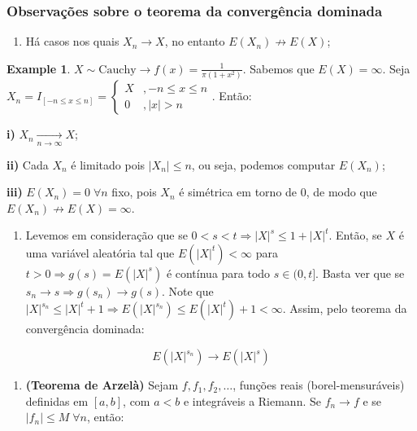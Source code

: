 \documentclass[
]{article}
\providecommand{\tightlist}{%
  \setlength{\itemsep}{0pt}\setlength{\parskip}{0pt}}
\theoremstyle{definition}
\theoremstyle{definition}
\newtheorem{example}{Example}[section]
\theoremstyle{definition}
\theoremstyle{definition}
\theoremstyle{remark}
\begin{document}
\hypertarget{observauxe7uxf5es-sobre-o-teorema-da-converguxeancia-dominada}{%
\subsubsection{Observações sobre o teorema da convergência dominada}\label{observauxe7uxf5es-sobre-o-teorema-da-converguxeancia-dominada}}

\begin{enumerate}
\def\labelenumi{\arabic{enumi}.}
\tightlist
\item
  Há casos nos quais \(X_{n} \to X\), no entanto \(E(X_{n}) \not\to E(X)\);
\end{enumerate}

\begin{example}
\(X \sim \mathrm{Cauchy} \rightarrow f(x) = \frac{1}{\pi(1 + x^{2})}\). Sabemos que \(E(X) = \infty\). Seja \(X_{n} = I_{[-n \le x \le n]} = \begin{cases} X &, -n \le x \le n \\ 0 &, |x| > n \end{cases}\). Então:

\textbf{i)} \(X_{n} \underset{n \to \infty}{\rightarrow} X\);

\textbf{ii)} Cada \(X_{n}\) é limitado pois \(|X_{n}| \le n\), ou seja, podemos computar \(E(X_{n})\);

\textbf{iii)} \(E(X_{n}) = 0 \;\forall n\) fixo, pois \(X_{n}\) é simétrica em torno de \(0\), de modo que \(E(X_{n}) \not \to E(X) = \infty\).
\end{example}

\begin{enumerate}
\def\labelenumi{\arabic{enumi}.}
\setcounter{enumi}{1}
\tightlist
\item
  Levemos em consideração que se \(0 < s < t \Rightarrow |X|^{s} \le 1 + |X|^{t}\). Então, se \(X\) é uma variável aleatória tal que \(E(|X|^{t}) < \infty\) para \(t > 0 \Rightarrow g(s) = E(|X|^{s})\) é contínua para todo \(s \in (0,t]\). Basta ver que se \(s_{n} \to s \Rightarrow g(s_{n}) \to g(s)\). Note que \(|X|^{s_{n}} \le |X|^{t} + 1 \Rightarrow E(|X|^{s_{n}}) \le E(|X|^{t}) + 1 < \infty\). Assim, pelo teorema da convergência dominada:
\end{enumerate}

\begin{equation*}
E(|X|^{s_{n}}) \to E(|X|^{s})
\end{equation*}

\begin{enumerate}
\def\labelenumi{\arabic{enumi}.}
\setcounter{enumi}{2}
\tightlist
\item
  \textbf{(Teorema de Arzelà)} Sejam \(f,f_{1},f_{2},\ldots\), funções reais (borel-mensuráveis) definidas em \([a,b]\), com \(a < b\) e integráveis a Riemann. Se \(f_{n} \to f\) e se \(|f_{n}| \le M \; \forall n\), então:
\end{enumerate}
\end{document}

